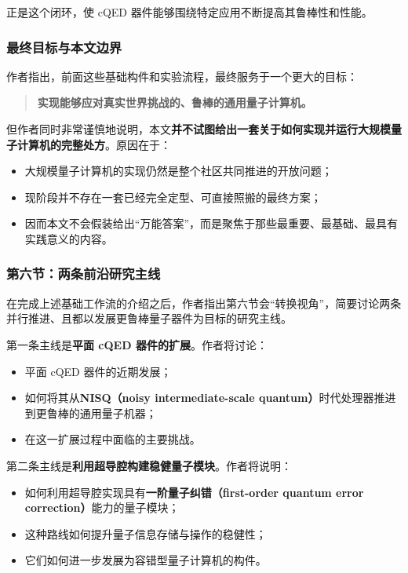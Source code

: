 \documentclass[12pt,a4paper,oneside]{ctexbook}
\begin{document}
正是这个闭环，使 cQED 器件能够围绕特定应用不断提高其鲁棒性和性能。

\subsubsection{最终目标与本文边界}

作者指出，前面这些基础构件和实验流程，最终服务于一个更大的目标：
\begin{quote}
\textbf{实现能够应对真实世界挑战的、鲁棒的通用量子计算机。}
\end{quote}

但作者同时非常谨慎地说明，本文\textbf{并不试图给出一套关于如何实现并运行大规模量子计算机的完整处方}。原因在于：
\begin{itemize}[leftmargin=2em]
    \item 大规模量子计算机的实现仍然是整个社区共同推进的开放问题；
    \item 现阶段并不存在一套已经完全定型、可直接照搬的最终方案；
    \item 因而本文不会假装给出“万能答案”，而是聚焦于那些最重要、最基础、最具有实践意义的内容。
\end{itemize}

\subsubsection{第六节：两条前沿研究主线}

在完成上述基础工作流的介绍之后，作者指出第六节会“转换视角”，简要讨论两条并行推进、且都以发展更鲁棒量子器件为目标的研究主线。

第一条主线是\textbf{平面 cQED 器件的扩展}。作者将讨论：
\begin{itemize}[leftmargin=2em]
    \item 平面 cQED 器件的近期发展；
    \item 如何将其从\textbf{NISQ（noisy intermediate-scale quantum）}时代处理器推进到更鲁棒的通用量子机器；
    \item 在这一扩展过程中面临的主要挑战。
\end{itemize}

第二条主线是\textbf{利用超导腔构建稳健量子模块}。作者将说明：
\begin{itemize}[leftmargin=2em]
    \item 如何利用超导腔实现具有\textbf{一阶量子纠错（first-order quantum error correction）}能力的量子模块；
    \item 这种路线如何提升量子信息存储与操作的稳健性；
    \item 它们如何进一步发展为容错型量子计算机的构件。
\end{itemize}
\end{document}
